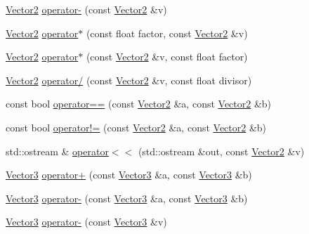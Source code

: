 \begin{DoxyCompactItemize}
\item 
\hyperlink{classprism_1_1geometry_1_1_vector2}{Vector2} \hyperlink{namespaceprism_1_1geometry_a70ec37efd504039e6ba83e90f8d8292e}{operator-\/} (const \hyperlink{classprism_1_1geometry_1_1_vector2}{Vector2} \&v)
\item 
\hyperlink{classprism_1_1geometry_1_1_vector2}{Vector2} \hyperlink{namespaceprism_1_1geometry_a9d7f5ae000f246c7b48455c06cacba43}{operator$\ast$} (const float factor, const \hyperlink{classprism_1_1geometry_1_1_vector2}{Vector2} \&v)
\item 
\hyperlink{classprism_1_1geometry_1_1_vector2}{Vector2} \hyperlink{namespaceprism_1_1geometry_a3eecf4078f447dac2c077bb5ff38d833}{operator$\ast$} (const \hyperlink{classprism_1_1geometry_1_1_vector2}{Vector2} \&v, const float factor)
\item 
\hyperlink{classprism_1_1geometry_1_1_vector2}{Vector2} \hyperlink{namespaceprism_1_1geometry_aac4e2dab314d5c9dd56879419917c6f9}{operator/} (const \hyperlink{classprism_1_1geometry_1_1_vector2}{Vector2} \&v, const float divisor)
\item 
const bool \hyperlink{namespaceprism_1_1geometry_a041aab500771782ce0182b1caa6ef7bb}{operator==} (const \hyperlink{classprism_1_1geometry_1_1_vector2}{Vector2} \&a, const \hyperlink{classprism_1_1geometry_1_1_vector2}{Vector2} \&b)
\item 
const bool \hyperlink{namespaceprism_1_1geometry_aabb5dc364671e4082770a87a21c02bf2}{operator!=} (const \hyperlink{classprism_1_1geometry_1_1_vector2}{Vector2} \&a, const \hyperlink{classprism_1_1geometry_1_1_vector2}{Vector2} \&b)
\item 
std\+::ostream \& \hyperlink{namespaceprism_1_1geometry_ae7358c89d3dd3f8b933b57355b1e7df1}{operator$<$$<$} (std\+::ostream \&out, const \hyperlink{classprism_1_1geometry_1_1_vector2}{Vector2} \&v)
\item 
\hyperlink{classprism_1_1geometry_1_1_vector3}{Vector3} \hyperlink{namespaceprism_1_1geometry_a8f5912c117e59e151c8d66571e3c23c4}{operator+} (const \hyperlink{classprism_1_1geometry_1_1_vector3}{Vector3} \&a, const \hyperlink{classprism_1_1geometry_1_1_vector3}{Vector3} \&b)
\item 
\hyperlink{classprism_1_1geometry_1_1_vector3}{Vector3} \hyperlink{namespaceprism_1_1geometry_a5d3f9692484ba5caa22a4d0e33a88054}{operator-\/} (const \hyperlink{classprism_1_1geometry_1_1_vector3}{Vector3} \&a, const \hyperlink{classprism_1_1geometry_1_1_vector3}{Vector3} \&b)
\item 
\hyperlink{classprism_1_1geometry_1_1_vector3}{Vector3} \hyperlink{namespaceprism_1_1geometry_ab38dadbffa2ced0c6a7789c08249de36}{operator-\/} (const \hyperlink{classprism_1_1geometry_1_1_vector3}{Vector3} \&v)

\end{DoxyCompactItemize}
